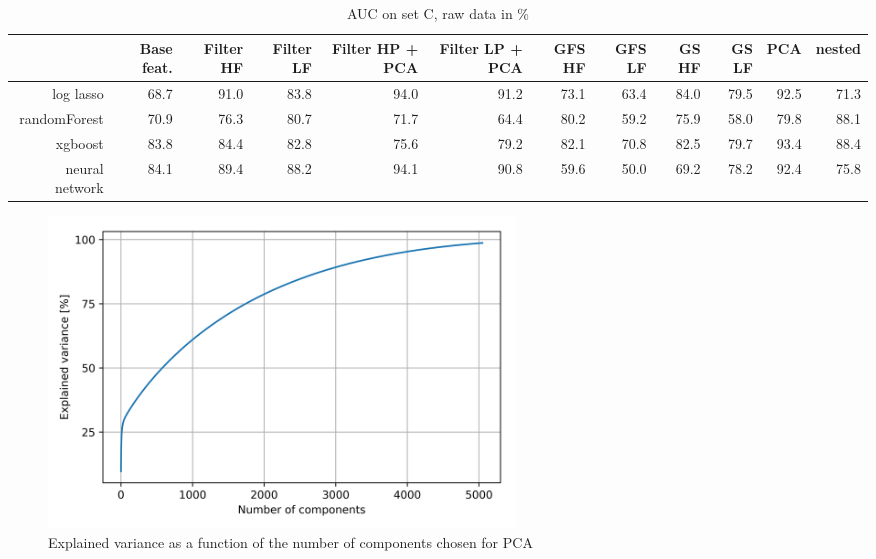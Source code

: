 \documentclass[10pt,conference,compsocconf]{IEEEtran}
\begin{document}
\begin{table}[H]
	\centering
	\begin{tabular}{r|rrrrrrrrrrr}
	\hline
	& Base feat. & Filter HF & Filter LF & Filter HP + PCA & Filter LP + PCA & GFS HF & GFS LF&GS HF &GS LF & PCA & nested \\ \hline
	 log lasso & 68.7 & 91.0 & 83.8 & 94.0 & 91.2 & 73.1 & 63.4 & 84.0 & 79.5 & 92.5 & 71.3 \\
	 randomForest & 70.9 & 76.3 & 80.7 & 71.7 & 64.4 & 80.2 & 59.2 & 75.9 & 58.0 & 79.8 & 88.1 \\
	 xgboost & 83.8 & 84.4 & 82.8 & 75.6 & 79.2 & 82.1 & 70.8 & 82.5 & 79.7 & 93.4 & 88.4 \\
	 neural network & 84.1 & 89.4 & 88.2 & 94.1 & 90.8 & 59.6 & 50.0 & 69.2 & 78.2 & 92.4 & 75.8 \\
	\hline
	\end{tabular}
	\caption{AUC on set C, raw data in \%}
	\vspace{-6mm}
\end{table}

\begin{figure}[H]
	\centering
	\includegraphics[width=0.6\textwidth]{pca_explvar.png}
	\caption{Explained variance as a function of the number of components chosen for PCA}
	\label{fig:explvar}
\end{figure}
\end{document}
